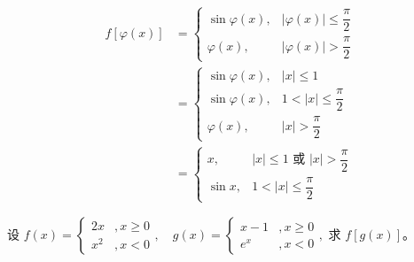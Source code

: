 \begin{Answer}
\begin{figure}[htbp]
    \end{figure}
    \[
    \begin{aligned}
    f[\varphi(x)]
    &=
    \begin{cases}
    \sin\varphi(x), & |\varphi(x)| \le \dfrac{\pi}{2} \\
    \varphi(x),     & |\varphi(x)| > \dfrac{\pi}{2}
    \end{cases}
    \\
    &=
    \begin{cases}
    \sin\varphi(x), & |x| \le 1 \\
    \sin\varphi(x), & 1 < |x| \le \dfrac{\pi}{2} \\
    \varphi(x),     & |x| > \dfrac{\pi}{2}
    \end{cases}
    \\
    &=
    \begin{cases}
    x,             & |x| \le 1 \text{ 或 } |x| > \dfrac{\pi}{2} \\
    \sin x,        & 1 < |x| \le \dfrac{\pi}{2}
    \end{cases}
    \end{aligned}
    \]
\end{Answer}
\begin{Problem}
    设
    \(
    f(x)=\begin{cases}
    2x&, x\ge 0 \\
    x^2&,  x<0
    \end{cases},
    \quad
    g(x)=\begin{cases}
    x-1&,  x\ge 0 \\
    e^x&,  x<0
    \end{cases},
    \)
    求 \(f[g(x)]\)。
\end{Problem}
